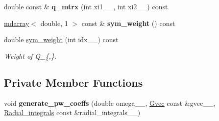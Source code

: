 \begin{DoxyCompactItemize}
\item 
\hypertarget{classsirius_1_1_augmentation__operator_aefcfcbcf831204ca78025ee753e3ce24}{}double const \& {\bfseries q\+\_\+mtrx} (int xi1\+\_\+\+\_\+, int xi2\+\_\+\+\_\+) const \label{classsirius_1_1_augmentation__operator_aefcfcbcf831204ca78025ee753e3ce24}

\item 
\hypertarget{classsirius_1_1_augmentation__operator_ae9f20bb75f8ae920df11a9feb1b94603}{}\hyperlink{classsddk_1_1mdarray}{mdarray}$<$ double, 1 $>$ const \& {\bfseries sym\+\_\+weight} () const \label{classsirius_1_1_augmentation__operator_ae9f20bb75f8ae920df11a9feb1b94603}

\item 
double \hyperlink{classsirius_1_1_augmentation__operator_ae3648dda8a0fc0089279e91abfb32c1e}{sym\+\_\+weight} (int idx\+\_\+\+\_\+) const 
\begin{DoxyCompactList}\small\item\em Weight of Q\+\_\+\{,\textquotesingle{}\}. \end{DoxyCompactList}\end{DoxyCompactItemize}
\subsection*{Private Member Functions}
\begin{DoxyCompactItemize}
\item 
\hypertarget{classsirius_1_1_augmentation__operator_a013ebfe021e3b6de59fe0ca96541bbfc}{}void {\bfseries generate\+\_\+pw\+\_\+coeffs} (double omega\+\_\+\+\_\+, \hyperlink{classsddk_1_1_gvec}{Gvec} const \&gvec\+\_\+\+\_\+, \hyperlink{classsirius_1_1_radial__integrals}{Radial\+\_\+integrals} const \&radial\+\_\+integrals\+\_\+\+\_\+)\label{classsirius_1_1_augmentation__operator_a013ebfe021e3b6de59fe0ca96541bbfc}

\end{DoxyCompactItemize}
